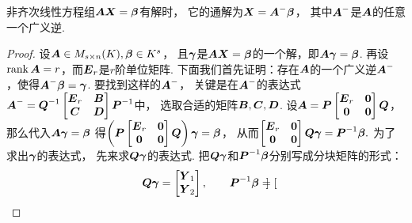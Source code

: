 \begin{theorem}[非齐次线性方程组的解的结构定理]\label{theorem:线性方程组.非齐次线性方程组的解的结构定理}
非齐次线性方程组\(\boldsymbol{A} \boldsymbol{X} = \boldsymbol\beta\)有解时，
它的通解为\(
	\boldsymbol{X} = \boldsymbol{A}^- \boldsymbol\beta
\)，
其中\(\boldsymbol{A}^-\)是\(\boldsymbol{A}\)的任意一个广义逆.
\begin{proof}
设\(
	\boldsymbol{A} \in M_{s \times n}(K),
	\boldsymbol\beta \in K^s
\)，
且\(\boldsymbol\gamma\)是\(\boldsymbol{A} \boldsymbol{X} = \boldsymbol\beta\)的一个解，即\(\boldsymbol{A} \boldsymbol\gamma = \boldsymbol\beta\).
再设\(\rank\boldsymbol{A} = r\)，而\(\boldsymbol{E}_r\)是\(r\)阶单位矩阵.
下面我们首先证明：存在\(\boldsymbol{A}\)的一个广义逆\(\boldsymbol{A}^-\)，使得\(\boldsymbol{A}^- \boldsymbol\beta = \boldsymbol\gamma\).
要找到这样的\(\boldsymbol{A}^-\)，
关键是在\(\boldsymbol{A}^-\)的表达式\(
	\boldsymbol{A}^-
	= \boldsymbol{Q}^{-1}
	\begin{bmatrix}
		\boldsymbol{E}_r & \boldsymbol{B} \\
		\boldsymbol{C} & \boldsymbol{D}
	\end{bmatrix}
	\boldsymbol{P}^{-1}
\)中，
选取合适的矩阵\(\boldsymbol{B},\boldsymbol{C},\boldsymbol{D}\).
设\(
	\boldsymbol{A}
	= \boldsymbol{P}
	\begin{bmatrix}
		\boldsymbol{E}_r & \boldsymbol0 \\
		\boldsymbol0 & \boldsymbol0
	\end{bmatrix}
	\boldsymbol{Q}
\)，
那么代入\(\boldsymbol{A} \boldsymbol\gamma = \boldsymbol\beta\)
得\(
	\left(
		\boldsymbol{P}
		\begin{bmatrix}
			\boldsymbol{E}_r & \boldsymbol0 \\
			\boldsymbol0 & \boldsymbol0
		\end{bmatrix}
		\boldsymbol{Q}
	\right)
	\boldsymbol\gamma
	= \boldsymbol\beta
\)，
从而\(
	\begin{bmatrix}
		\boldsymbol{E}_r & \boldsymbol0 \\
		\boldsymbol0 & \boldsymbol0
	\end{bmatrix}
	\boldsymbol{Q} \boldsymbol\gamma
	= \boldsymbol{P}^{-1} \boldsymbol\beta.
\)
为了求出\(\boldsymbol\gamma\)的表达式，
先来求\(\boldsymbol{Q} \boldsymbol\gamma\)的表达式.
把\(\boldsymbol{Q} \boldsymbol\gamma\)和\(\boldsymbol{P}^{-1} \boldsymbol\beta\)分别写成分块矩阵的形式：\begin{equation*}
	\boldsymbol{Q} \boldsymbol\gamma
	= \begin{bmatrix}
		\boldsymbol{Y}_1 \\ \boldsymbol{Y}_2
	\end{bmatrix},
	\qquad
	\boldsymbol{P}^{-1} \boldsymbol\beta
	= \begin{bmatrix}

\end{bmatrix}
\end{equation*}
\end{proof}
\end{theorem}
